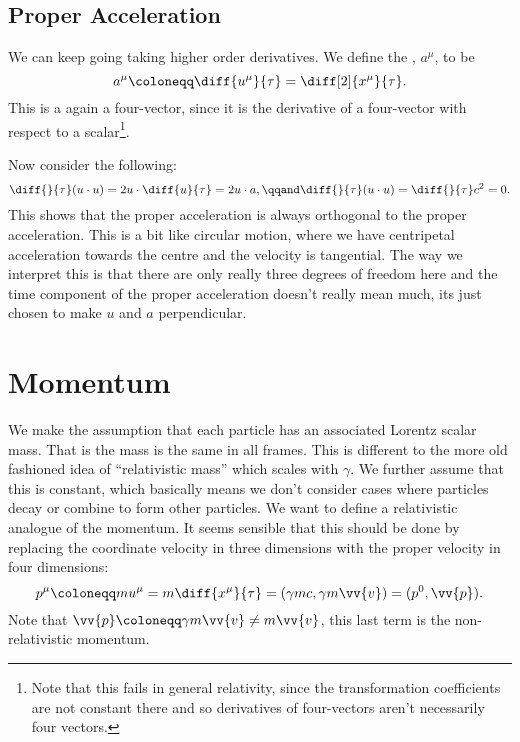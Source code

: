\subsection{Proper Acceleration}
We can keep going taking higher order derivatives.
We define the , \(a^\mu\), to be
\begin{equation}
    a^\mu \coloneqq \diff{u^\mu}{\tau} = \diff[2]{x^\mu}{\tau}.
\end{equation}
This is a again a four-vector, since it is the derivative of a four-vector with respect to a scalar\footnote{Note that this fails in general relativity, since the transformation coefficients are not constant there and so derivatives of four-vectors aren't necessarily four vectors.}.

Now consider the following:
\begin{equation}
    \diff{}{\tau}(u \cdot u) = 2u\cdot\diff{u}{\tau} = 2u\cdot a, \qqand \diff{}{\tau}(u \cdot u) = \diff{}{\tau}c^2 = 0.
\end{equation}
This shows that the proper acceleration is always orthogonal to the proper acceleration.
This is a bit like circular motion, where we have centripetal acceleration towards the centre and the velocity is tangential.
The way we interpret this is that there are only really three degrees of freedom here and the time component of the proper acceleration doesn't really mean much, its just chosen to make \(u\) and \(a\) perpendicular.

\section{Momentum}
We make the assumption that each particle has an associated Lorentz scalar mass.
That is the mass is the same in all frames.
This is different to the more old fashioned idea of \enquote{relativistic mass} which scales with \(\gamma\).
We further assume that this is constant, which basically means we don't consider cases where particles decay or combine to form other particles.
We want to define a relativistic analogue of the momentum.
It seems sensible that this should be done by replacing the coordinate velocity in three dimensions with the proper velocity in four dimensions:
\begin{equation}
    p^\mu \coloneqq mu^\mu = m\diff{x^\mu}{\tau} = (\gamma mc, \gamma m\vv{v}) = (p^0, \vv{p}).
\end{equation}
Note that \(\vv{p} \coloneqq \gamma m\vv{v} \ne m \vv{v}\), this last term is the non-relativistic momentum.

